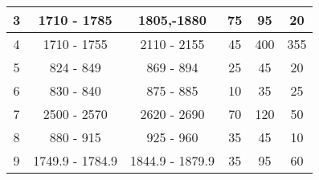 \begin{table}[]
\begin{tabular}{|c|c|c|c|c|c|}
3                                                           & 1710 - 1785                                            & 1805,-1880                                               & 75                                                                   & 95                                                               & 20                                                          \\ \hline
4                                                           & 1710 - 1755                                            & 2110 - 2155                                              & 45                                                                   & 400                                                              & 355                                                         \\ \hline
5                                                           & 824 - 849                                              & 869 - 894                                                & 25                                                                   & 45                                                               & 20                                                          \\ \hline
6                                                           & 830 - 840                                              & 875 - 885                                                & 10                                                                   & 35                                                               & 25                                                          \\ \hline
7                                                           & 2500 - 2570                                            & 2620 - 2690                                              & 70                                                                   & 120                                                              & 50                                                          \\ \hline
8                                                           & 880 - 915                                              & 925 - 960                                                & 35                                                                   & 45                                                               & 10                                                          \\ \hline
9                                                           & 1749.9 - 1784.9                                        & 1844.9 - 1879.9                                          & 35                                                                   & 95                                                               & 60                                                          \\ \hline

\end{tabular}
\end{table}
